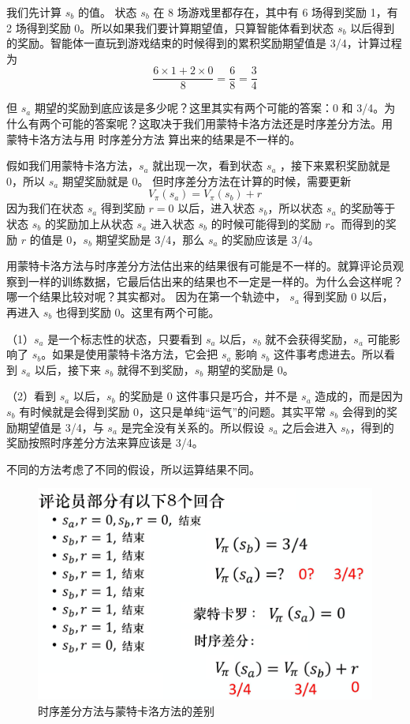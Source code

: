 我们先计算 $s_b$ 的值。 状态 $s_b$ 在 8 场游戏里都存在，其中有 6 场得到奖励 1，有 2 场得到奖励 0。所以如果我们要计算期望值，只算智能体看到状态 $s_b$ 以后得到的奖励。智能体一直玩到游戏结束的时候得到的累积奖励期望值是 3/4，计算过程为
\begin{equation}
    \label{eq:}
    \frac{6 \times 1 + 2 \times 0}{8}=\frac{6}{8}=\frac{3}{4}
\end{equation}

但 $s_a$ 期望的奖励到底应该是多少呢？这里其实有两个可能的答案：0 和 3/4。为什么有两个可能的答案呢？这取决于我们用蒙特卡洛方法还是时序差分方法。用 蒙特卡洛方法与用 时序差分方法 算出来的结果是不一样的。

假如我们用蒙特卡洛方法，$s_a$ 就出现一次，看到状态 $s_a$ ，接下来累积奖励就是 0，所以 $s_a$ 期望奖励就是 0。
但时序差分方法在计算的时候，需要更新
\begin{equation}
    \label{eq:}
    V_{\pi}\left(s_{a}\right)=V_{\pi}\left(s_{b}\right)+r
\end{equation}
因为我们在状态 $s_a$ 得到奖励 $r=0$ 以后，进入状态 $s_b$，所以状态 $s_a$ 的奖励等于状态 $s_b$ 的奖励加上从状态 $s_a$ 进入状态 $s_b$ 的时候可能得到的奖励 $r$。而得到的奖励 $r$ 的值是 0，$s_b$ 期望奖励是 3/4，那么 $s_a$ 的奖励应该是 3/4。

用蒙特卡洛方法与时序差分方法估出来的结果很有可能是不一样的。就算评论员观察到一样的训练数据，它最后估出来的结果也不一定是一样的。为什么会这样呢？哪一个结果比较对呢？其实都对。
因为在第一个轨迹中， $s_a$ 得到奖励 0 以后，再进入 $s_b$ 也得到奖励 0。这里有两个可能。

（1）$s_a$ 是一个标志性的状态，只要看到 $s_a$ 以后，$s_b$ 就不会获得奖励，$s_a$ 可能影响了 $s_b$。如果是使用蒙特卡洛方法，它会把 $s_a$ 影响 $s_b$ 这件事考虑进去。所以看到 $s_a$ 以后，接下来 $s_b$ 就得不到奖励，$s_b$ 期望的奖励是 0。

（2）看到 $s_a$ 以后，$s_b$ 的奖励是 0 这件事只是巧合，并不是 $s_a$ 造成的，而是因为 $s_b$ 有时候就是会得到奖励 0，这只是单纯“运气”的问题。其实平常 $s_b$ 会得到的奖励期望值是 3/4，与 $s_a$ 是完全没有关系的。所以假设 $s_a$ 之后会进入 $s_b$，得到的奖励按照时序差分方法来算应该是 3/4。

不同的方法考虑了不同的假设，所以运算结果不同。

\begin{figure}[hbt]
    \centering
    \includegraphics[width=0.5\linewidth]{res/ch6/6.6}
    \caption{时序差分方法与蒙特卡洛方法的差别}
    \label{fig:fig6.6}
\end{figure}

